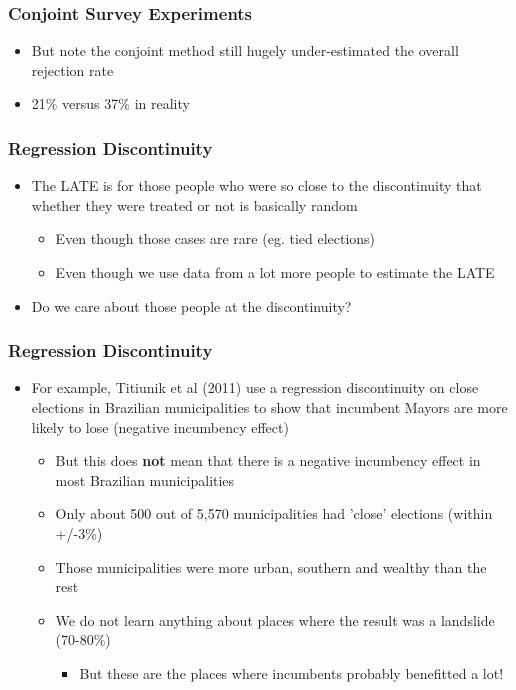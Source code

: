 \documentclass[xcolor=x11names,compress]{beamer}\usepackage[]{graphicx}\usepackage[]{color}
\renewcommand{\(}{\begin{columns}}
\renewcommand{\)}{\end{columns}}
\newcommand{\<}[1]{\begin{column}{#1}}
\renewcommand{\>}{\end{column}}
\begin{document}


\begin{frame}
\frametitle{Conjoint Survey Experiments}
\begin{itemize}
\item But note the conjoint method still hugely under-estimated the overall rejection rate
\item 21\% versus 37\% in reality
\end{itemize}
\end{frame}

\begin{frame}
\frametitle{Regression Discontinuity}
\begin{itemize}
\item The LATE is for those people who were so close to the discontinuity that whether they were treated or not is basically random
\begin{itemize}
\item Even though those cases are rare (eg. tied elections)
\item Even though we use data from a lot more people to estimate the LATE
\end{itemize}
\item Do we care about those people at the discontinuity?
\end{itemize}
\end{frame}

\begin{frame}
\frametitle{Regression Discontinuity}
\begin{itemize}
\item For example, Titiunik et al (2011) use a regression discontinuity on close elections in Brazilian municipalities to show that incumbent Mayors are more likely to lose (negative incumbency effect)
\begin{itemize}
\item But this does \textbf{not} mean that there is a negative incumbency effect in most Brazilian municipalities
\item Only about 500 out of 5,570 municipalities had 'close' elections (within +/-3\%)
\item Those municipalities were more urban, southern and wealthy than the rest
\item We do not learn anything about places where the result was a landslide (70-80\%)
\begin{itemize}
\item But these are the places where incumbents probably benefitted a lot!
\end{itemize}
\end{itemize}
\end{itemize}
\end{frame}
\end{document}
